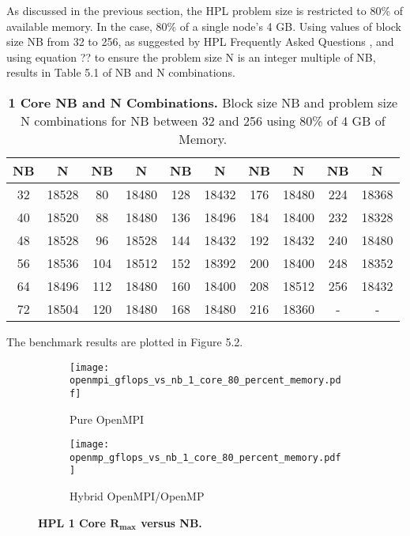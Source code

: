 As discussed in the previous section, the HPL problem size is restricted to 80\% of available memory. In the case, 80\% of a single node's 4 GB. Using values of block size NB from 32 to 256, as suggested by HPL Frequently Asked Questions \cite{hpl-faq}, and using equation ?? to ensure the problem size N is an integer multiple of NB, results in Table 5.1 of NB and N combinations.

\begin{table}[H]
\begin{center}
	\begin{tabular}{ |c|c|c|c|c|c|c|c|c|c| } 
		\hline
		\textbf{NB} & \textbf{N} & \textbf{NB} & \textbf{N} & \textbf{NB} & \textbf{N} & \textbf{NB} & \textbf{N} & \textbf{NB} & \textbf{N} \\ 
		\hline
		32 & 18528 &  80 & 18480 & 128 & 18432 & 176 & 18480 & 224 & 18368 \\ 
		40 & 18520 &  88 & 18480 & 136 & 18496 & 184 & 18400 & 232 & 18328 \\ 
 		48 & 18528 &  96 & 18528 & 144 & 18432 & 192 & 18432 & 240 & 18480 \\
		56 & 18536 & 104 & 18512 & 152 & 18392 & 200 & 18400 & 248 & 18352 \\ 
 		64 & 18496 & 112 & 18480 & 160 & 18400 & 208 & 18512 & 256 & 18432 \\
		72 & 18504 & 120 & 18480 & 168 & 18480 & 216 & 18360 &   - &     - \\ 
 		\hline
	\end{tabular}
\end{center}
\caption{\label{tab:table-name}\textbf{1 Core NB and N Combinations.} Block size NB and problem size N combinations for NB between 32 and 256 using 80\% of 4 GB of Memory.}
\end{table}

The benchmark results are plotted in Figure 5.2.

\begin{figure}[H]
	\begin{subfigure}{1.0\textwidth}
		\centering
		\texttt{[image: openmpi\_gflops\_vs\_nb\_1\_core\_80\_percent\_memory.pdf]}
		\caption{Pure OpenMPI}
		\label{fig:subim1}
	\end{subfigure}
	\par\bigskip
	\begin{subfigure}{1.0\textwidth}
		\centering
		\texttt{[image: openmp\_gflops\_vs\_nb\_1\_core\_80\_percent\_memory.pdf]}
		\caption{Hybrid OpenMPI/OpenMP}
		\label{fig:subim2}
	\end{subfigure}
\caption{\textbf{HPL 1 Core $\mathbf{R_{max}}$ versus NB.}}
\label{fig:image2}
\end{figure}

